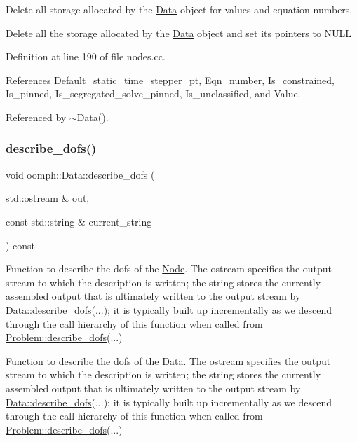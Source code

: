Delete all storage allocated by the \hyperlink{classoomph_1_1Data}{Data} object for values and equation numbers. 

Delete all the storage allocated by the \hyperlink{classoomph_1_1Data}{Data} object and set its pointers to N\+U\+LL 

Definition at line 190 of file nodes.\+cc.



References Default\+\_\+static\+\_\+time\+\_\+stepper\+\_\+pt, Eqn\+\_\+number, Is\+\_\+constrained, Is\+\_\+pinned, Is\+\_\+segregated\+\_\+solve\+\_\+pinned, Is\+\_\+unclassified, and Value.



Referenced by $\sim$\+Data().

\mbox{\label{classoomph_1_1Data_a2dae16e2dcff9a40029f834c83364df5}} 
\subsubsection{\texorpdfstring{describe\+\_\+dofs()}{describe\_dofs()}}
{\footnotesize\ttfamily void oomph\+::\+Data\+::describe\+\_\+dofs (\begin{DoxyParamCaption}\item[{std\+::ostream \&}]{out,  }\item[{const std\+::string \&}]{current\+\_\+string }\end{DoxyParamCaption}) const\hspace{0.3cm}{\ttfamily [virtual]}}



Function to describe the dofs of the \hyperlink{classoomph_1_1Node}{Node}. The ostream specifies the output stream to which the description is written; the string stores the currently assembled output that is ultimately written to the output stream by \hyperlink{classoomph_1_1Data_a2dae16e2dcff9a40029f834c83364df5}{Data\+::describe\+\_\+dofs}(...); it is typically built up incrementally as we descend through the call hierarchy of this function when called from \hyperlink{classoomph_1_1Problem_abc103804eb319ae0b3d43870cc3e1eaf}{Problem\+::describe\+\_\+dofs}(...) 

Function to describe the dofs of the \hyperlink{classoomph_1_1Data}{Data}. The ostream specifies the output stream to which the description is written; the string stores the currently assembled output that is ultimately written to the output stream by \hyperlink{classoomph_1_1Data_a2dae16e2dcff9a40029f834c83364df5}{Data\+::describe\+\_\+dofs}(...); it is typically built up incrementally as we descend through the call hierarchy of this function when called from \hyperlink{classoomph_1_1Problem_abc103804eb319ae0b3d43870cc3e1eaf}{Problem\+::describe\+\_\+dofs}(...) 


